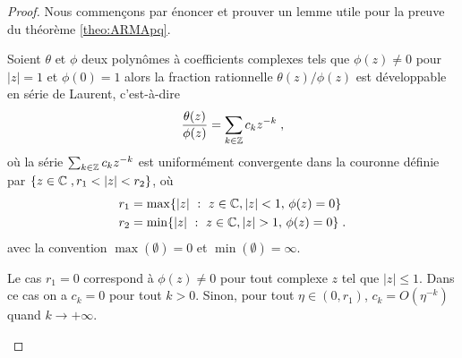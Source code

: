 \begin{proof}
Nous commen\c{c}ons par \'enoncer et prouver un lemme utile pour la preuve
du th\'eor\`eme \ref{theo:ARMApq}.
\begin{lemma}\label{lem:dev_laurent}
  Soient $\theta$ et $\phi$ deux polyn\^omes \`a coefficients complexes tels que
  $\phi(z) \neq 0$ pour $|z|=1$ et $\phi(0)=1$ alors la fraction rationnelle
  $\theta(z)/\phi(z)$ est d\'eveloppable en s\'erie de Laurent, c'est-\`a-dire
$$
\frac{\theta(z)}{\phi(z)}=\sum_{k\in\mathbb{Z}} c_k z^{-k}\;,
$$
o\`u la s\'erie $\sum_{k \in \mathbb{Z}} c_k z^{-k}$ est uniform\'ement convergente dans la
couronne d\'efinie par
$\left\{ z\in\cset \eqsp, r_1<|z|<r_2 \right\}$, o\`u
\begin{align*}
r_1&=\max\{ |z|~:~ z \in \mathbb{C}, | z | < 1, \,\phi(z) =0 \}\\
r_2&=\min\{ |z|~:~ z  \in \mathbb{C}, |z| > 1, \,\phi(z) = 0 \}\; .
\end{align*}
avec la convention $\max(\emptyset)=0$ et $\min(\emptyset)=\infty$.

Le cas $r_1=0$ correspond \`a $\phi(z)\neq0$ pour tout complexe $z$ tel que
$|z|\leq1$. Dans ce cas on a $c_k=0$ pour tout $k>0$.
Sinon, pour tout $\eta\in(0,r_1)$, $c_k=O(\eta^{-k})$ quand $k\to +\infty$.


\end{lemma}
\end{proof}
